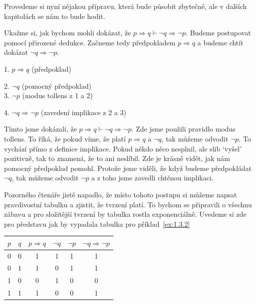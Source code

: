 Provedeme si nyní nějakou přípravu, která bude působit zbytečně, ale v dalších kapitolách se nám to bude hodit.
\begin{example}
  Ukažme si, jak bychom mohli dokázat, že $p \Rightarrow q \vdash \neg q \Rightarrow \neg p$. Budeme postupovat pomocí přirozené dedukce. Začneme tedy předpokladem $p \Rightarrow q$ a budeme chtít dokázat $\neg q \Rightarrow \neg p$. 
  \begin{proofbox}
    1. $p \Rightarrow q$ (předpoklad) 
    \begin{proofbox}
      2. $\neg q$ (pomocný předpoklad) \\
      3. $\neg p$ (modus tollens z 1 a 2)
    \end{proofbox}
    4. $\neg q \Rightarrow \neg p$ (zavedení implikace z 2 a 3)
  \end{proofbox}
  Tímto jsme dokázali, že $p \Rightarrow q \vdash \neg q \Rightarrow \neg p$. Zde jsme použili pravidlo modus tollens. To říká, že pokud víme, že platí $p \Rightarrow q$ a $\neg q$, tak můžeme odvodit $\neg p$. To vychází přímo z definice implikace. Pokud někdo něco nesplnil, ale slib `vyšel' pozitivně, tak to znamená, že to ani neslíbil. Zde je krásně vidět, jak nám pomocný předpoklad pomohl. Protože jsme viděli, že když budeme předpokládat $\neg q$, tak můžeme odvodit $\neg p$ a z toho jsme zavedli chtěnou implikaci.
\end{example}

Pozorného čtenáře jistě napadlo, že místo tohoto postupu si můžeme napsat pravdivostní tabulku a zjistit, že tvrzení platí. To bychom se připravili o všechnu zábavu a pro složitější tvrzení by tabulka rostla exponenciálně.
Uvedeme si zde pro představu jak by vypadala tabulka pro příklad~\ref{ex:1.3.2}
\begin{center}
  \begin{tabular}{|c|c|c|c|c|c|}
    \hline
    $p$ & $q$ & $p \Rightarrow q$ & $\neg q$ & $\neg p$ & $\neg q \Rightarrow \neg p$ \\
    \hline
    0 & 0 & 1 & 1 & 1 & 1 \\
    0 & 1 & 1 & 0 & 1 & 1 \\
    1 & 0 & 0 & 1 & 0 & 0 \\
    1 & 1 & 1 & 0 & 0 & 1 \\
    \hline
  \end{tabular}
\end{center}

